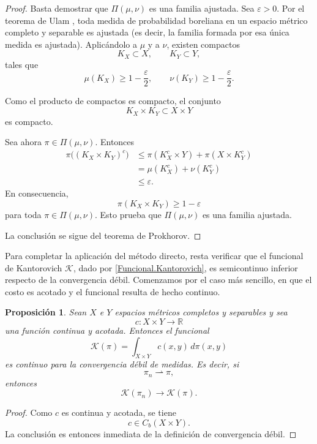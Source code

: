 \documentclass[12pt, a4paper]{amsbook}
\newtheorem{prop}[teo]{Proposición}
\theoremstyle{remark}
\theoremstyle{definition}
\numberwithin{section}{chapter}
\numberwithin{subsection}{section}
\numberwithin{equation}{section}
\numberwithin{figure}{chapter}
\begin{document}
\begin{proof}
Basta demostrar que \(\Pi(\mu,\nu)\) es una familia ajustada. Sea
\(\varepsilon>0\). Por el teorema de Ulam \cite[Theorem~1.3]{Billingsley},
toda medida de probabilidad boreliana en un espacio métrico completo y
separable es ajustada (es decir, la familia formada por esa única medida es
ajustada). Aplicándolo a \(\mu\) y a \(\nu\), existen compactos
\[
K_X\subset X,
\qquad
K_Y\subset Y,
\]
tales que
\[
\mu(K_X)\ge1-\frac{\varepsilon}{2},
\qquad
\nu(K_Y)\ge1-\frac{\varepsilon}{2}.
\]

Como el producto de compactos es compacto, el conjunto
\[
K_X\times K_Y\subset X\times Y
\]
es compacto.

Sea ahora \(\pi\in\Pi(\mu,\nu)\). Entonces
\begin{align*}
\pi\bigl((K_X\times K_Y)^c\bigr)
&\le
\pi(K_X^c\times Y)+
\pi(X\times K_Y^c)\\
&=
\mu(K_X^c)+\nu(K_Y^c)\\
&\le\varepsilon.
\end{align*}
En consecuencia,
\[
\pi(K_X\times K_Y)\ge1-\varepsilon
\]
para toda \(\pi\in\Pi(\mu,\nu)\). Esto prueba que \(\Pi(\mu,\nu)\) es una familia ajustada.

La conclusión se sigue del teorema de Prokhorov.
\end{proof}



Para completar la aplicación del método directo, resta verificar que el funcional de Kantorovich $\mathcal K$, dado por \eqref{Funcional.Kantorovich}, es semicontinuo inferior respecto de la convergencia débil. Comenzamos por el caso más sencillo, en que el costo es acotado y el funcional resulta de hecho continuo.

\begin{prop}
Sean \(X\) e \(Y\) espacios métricos completos y separables y sea
\[
c\colon X\times Y\to\mathbb R
\]
una función continua y acotada. Entonces el funcional
\[
\mathcal K(\pi)=\int_{X\times Y} c(x,y)\,d\pi(x,y)
\]
es continuo para la convergencia débil de medidas. Es decir, si
\[
\pi_n\rightharpoonup\pi,
\]
entonces
\[
\mathcal K(\pi_n)\longrightarrow\mathcal K(\pi).
\]
\end{prop}

\begin{proof}
Como \(c\) es continua y acotada, se tiene
\[
c\in C_b(X\times Y).
\]
La conclusión es entonces inmediata de la definición de convergencia débil.
\end{proof}
\end{document}
